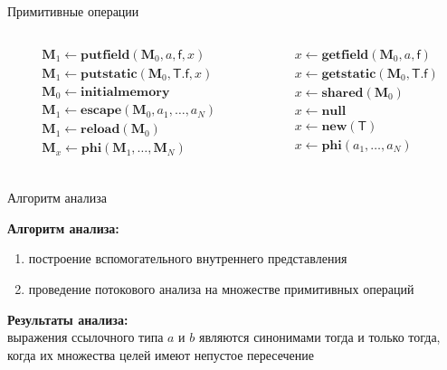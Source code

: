 \documentclass[usenames,dvipsnames,pdftex,unicode,hidelinks]{beamer}
\newcommand{\M}{\ensuremath{\mathbf{M}}}
\newcommand{\type}[1]{\mathsf{#1}}
\newcommand{\field}[1]{\mathsf{#1}}
\newcommand{\sfield}[2]{\type{#1}.\field{#2}}
\newcommand{\op}[1]{\mathbf{#1}}
\begin{document}
\begin{frame}{Примитивные операции}

  \begin{columns}[t]
    \begin{column}{0.5\textwidth}
      \begin{align*}
        &\M_1 \gets \op{putfield}(\M_0, a, \field{f}, x) \\
        &\M_1 \gets \op{putstatic}(\M_0, \sfield{T}{f}, x) \\
        &\M_0 \gets \op{initialmemory } \\
        &\M_1 \gets \op{escape}(\M_0, a_1, \ldots, a_N) \\
        &\M_1 \gets \op{reload}(\M_0) \\
        &\M_x \gets \op{phi}(\M_1, \ldots, \M_N) \\
      \end{align*}
    \end{column}
    \begin{column}{0.5\textwidth}
      \begin{align*}
        &x \gets \op{getfield}(\M_0, a, \field{f}) \\
        &x \gets \op{getstatic}(\M_0, \sfield{T}{f}) \\
        &x \gets \op{shared}(\M_0) \\
        &x \gets \op{null } \\
        &x \gets \op{new}(\type{T}) \\
        &x \gets \op{phi}(a_1, \ldots, a_N) \\
      \end{align*}
    \end{column}
  \end{columns}

\end{frame}

\begin{frame}{Алгоритм анализа}

  \textbf{Алгоритм анализа:}
  \begin{enumerate}
    \item построение вспомогательного внутреннего представления
    \item проведение потокового анализа на множестве примитивных операций
  \end{enumerate}

  \medskip
  \textbf{Результаты анализа:} \\
  выражения ссылочного типа $a$ и $b$ являются синонимами тогда и только тогда,
  когда их множества целей имеют непустое пересечение

\end{frame}
\end{document}

